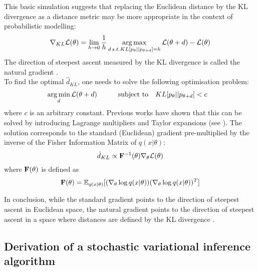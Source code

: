 This basic simulation suggests that replacing the Euclidean distance by the KL divergence as a distance metric may be more appropriate in the context of probabilistic modelling:
\[
	\nabla_{KL} \mathcal{L}(\theta) = \lim_{h\to0} \frac{1}{h}\operatorname*{arg\,max}_{d \, s.t. KL[p_\theta||p_{\theta+d}]=h} \mathcal{L}(\theta+d) - \mathcal{L}(\theta)
\]
The direction of steepest ascent measured by the KL divergence is called the natural gradient \cite{Amari1998,Martens2014}.\\
To find the optimal $\hat{d}_{KL}$, one needs to solve the following optimisation problem:
\begin{equation*} \begin{aligned}
	&\operatorname*{arg\,min}_{d} \mathcal{L}(\theta+d) \qquad
	& \text{subject to}
	& \quad KL[p_\theta||p_{\theta+d}] < c
\end{aligned} \end{equation*}
where $c$ is an arbitrary constant. Previous works have shown that this can be solved by introducing Lagrange multipliers and Taylor expansions (see \cite{Amari1998,Kristiadi2019}). The solution corresponds to the standard (Euclidean) gradient pre-multiplied by the inverse of the Fisher Information Matrix of $q(x|\theta)$:
\begin{equation}\label{natural_gradient}
	\hat{d}_{KL} \propto {\bf F}^{-1}(\theta) \nabla_{\theta} \mathcal{L}(\theta)
\end{equation}
where ${\bf F}(\theta)$ is defined as
\[
	{\bf F}(\theta) = \mathbb{E}_{q(x|\theta)}[(\nabla_\theta \log q(x|\theta)) (\nabla_\theta \log q(x|\theta))^T]
\]


In conclusion, while the standard gradient points to the direction of steepest ascent in Euclidean space, the natural gradient points to the direction of steepest ascent in a space where distances are defined by the KL divergence \cite{Kristiadi2019,Amari1998,Hoffman2012}.


\subsection{Derivation of a stochastic variational inference algorithm} \label{section:stochastic_variational_inference}

